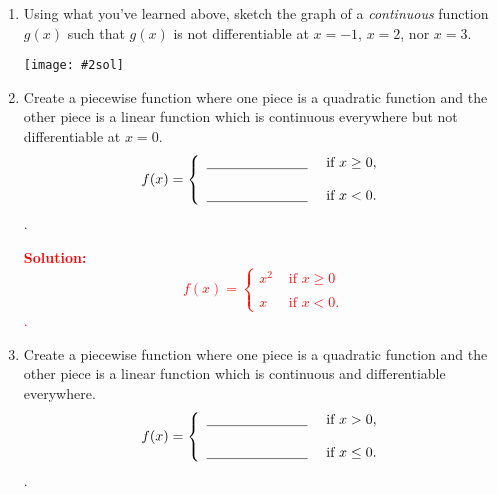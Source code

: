 \documentclass[letterpaper,11pt]{article}
\newcommand{\sol}[2]{\begin{minipage}[c][#1]{\linewidth}{\textcolor{red}{\textbf{Solution:}}\quad \textcolor{red}{#2}}\end{minipage}}
\newcommand{\fsol}[2]{\texttt{[image: \#2sol]}}
\newcommand{\sol}[2]{\begin{minipage}[c][#1]{\linewidth}{\vfill}\end{minipage}}
\newcommand{\fsol}[2]{\texttt{[image: \#2]}}
\begin{document}
\begin{enumerate}
\begin{enumerate}
\begin{enumerate}
\sol{1in}{
$$\lim_{h\rightarrow 0^-}\frac{f(0+h)-f(0)}{h}=\lim_{h\rightarrow 0^-}\frac{|h|-|0|}{h}=\lim_{h\rightarrow 0^-}\frac{-h-0}{h}=\lim_{h\rightarrow 0^-}-1=-1$$(since $h\to 0^-$ means $h$ is negative, so $|h|=-h$).
}

\item What do your answers to parts (i) and (ii) tell you about $f'(0)$?  Please explain.

\sol{1 in}{
Since the righthand limit $\lim_{h\rightarrow 0^+}\frac{f(0+h)-f(0)}{h}$ does NOT equal the lefthand limit $\lim_{h\rightarrow 0^-}\frac{f(0+h)-f(0)}{h}$, the (two-sided) limit $\lim_{h\rightarrow 0}\frac{f(0+h)-f(0)}{h}$ does not exist.  But this  (two-sided) limit is $f'(0)$, so $f'(0)$ does not exist.
}
\end{enumerate}
\end{enumerate}

\newpage
\item  Using what you've learned above, sketch the graph of a {\it continuous} function  $g(x)$  such that $g(x)$ is not differentiable at $x=-1$, $x=2$, nor $x=3$. 
\begin{center}
\fsol{.6}{fig4d}
\end{center}
\item Create a piecewise function where one piece is a quadratic function and the other piece is a linear function which is continuous everywhere but not differentiable at $x=0$.
\begin{displaymath}
  f(x) = \left\{
     \begin{array}{ll}
      \underline{\hskip1in} & \mbox{ if } x\ge 0, \\ \\
	 \underline{\hskip1in}& \mbox{ if } x<0.
     \end{array}
   \right.
\end{displaymath}.

\sol{.8 in}{
\begin{displaymath}
  f(x) = \left\{
     \begin{array}{ll}
      x^2 & \mbox{ if } x\ge0 \\ \\
      x & \mbox{ if } x<0.
     \end{array}
   \right.
\end{displaymath}.
}

\item Create a piecewise function where one piece is a quadratic function and the other piece is a linear function which is continuous and differentiable everywhere.
\begin{displaymath}
  f(x) = \left\{
     \begin{array}{ll}
      \underline{\hskip1in} & \mbox{ if } x> 0, \\ \\
	 \underline{\hskip1in}& \mbox{ if } x \leq 0.
     \end{array}
   \right.
\end{displaymath}.


\end{enumerate}
\end{document}

